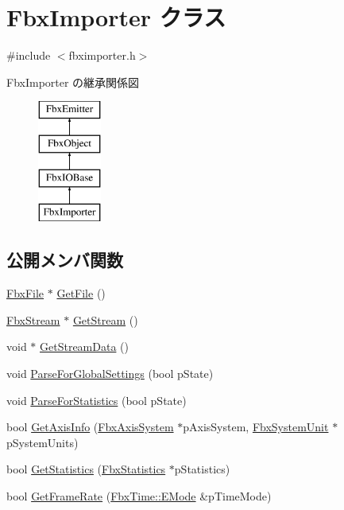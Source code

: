 \hypertarget{class_fbx_importer}{}\section{Fbx\+Importer クラス}
\label{class_fbx_importer}


{\ttfamily \#include $<$fbximporter.\+h$>$}

Fbx\+Importer の継承関係図\begin{figure}[H]
\begin{center}
\leavevmode
\includegraphics[height=4.000000cm]{class_fbx_importer}
\end{center}
\end{figure}
\subsection*{公開メンバ関数}
\begin{DoxyCompactItemize}
\item 
\hyperlink{class_fbx_file}{Fbx\+File} $\ast$ \hyperlink{class_fbx_importer_aae49abec02c1df7de8a7e12480607c08}{Get\+File} ()
\item 
\hyperlink{class_fbx_stream}{Fbx\+Stream} $\ast$ \hyperlink{class_fbx_importer_a7df99385df3407f5c17a9badf748fcab}{Get\+Stream} ()
\item 
void $\ast$ \hyperlink{class_fbx_importer_ab6b8c23dbcfa775b97467e430ff204ec}{Get\+Stream\+Data} ()
\item 
void \hyperlink{class_fbx_importer_a02c8d2c9b66de94b9434bf0225c67cd7}{Parse\+For\+Global\+Settings} (bool p\+State)
\item 
void \hyperlink{class_fbx_importer_a4a3340dfe262ac8a6c3ae6ebbc793201}{Parse\+For\+Statistics} (bool p\+State)
\item 
bool \hyperlink{class_fbx_importer_a57e28b23f1290b95ea49dcee58956f12}{Get\+Axis\+Info} (\hyperlink{class_fbx_axis_system}{Fbx\+Axis\+System} $\ast$p\+Axis\+System, \hyperlink{class_fbx_system_unit}{Fbx\+System\+Unit} $\ast$p\+System\+Units)
\item 
bool \hyperlink{class_fbx_importer_adbeaacef0c86132fcce5b585338e138d}{Get\+Statistics} (\hyperlink{class_fbx_statistics}{Fbx\+Statistics} $\ast$p\+Statistics)
\item 
bool \hyperlink{class_fbx_importer_aedbe9d10d808adcb39a84c72d71757cd}{Get\+Frame\+Rate} (\hyperlink{class_fbx_time_acc529b00a0e8d4c3da3702449ca93031}{Fbx\+Time\+::\+E\+Mode} \&p\+Time\+Mode)
\end{DoxyCompactItemize}
